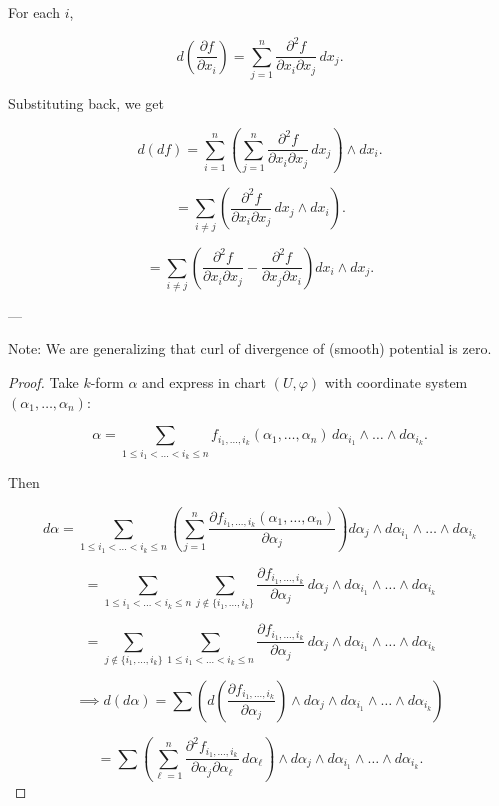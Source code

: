 \documentclass[11pt]{article}
\theoremstyle{definition}
\theoremstyle{remark}
\begin{document}
For each $i$,

\[
d\left(\frac{\partial f}{\partial x_i}\right) = \sum_{j=1}^n \frac{\partial^2 f}{\partial x_i \partial x_j} \, dx_j.
\]

Substituting back, we get

\[
d(df) = \sum_{i=1}^n \left(\sum_{j=1}^n \frac{\partial^2 f}{\partial x_i \partial x_j} \, dx_j\right) \wedge dx_i.
\]

\[
= \sum_{i \neq j} \left(\frac{\partial^2 f}{\partial x_i \partial x_j} \, dx_j \wedge dx_i\right).
\]

\[
= \sum_{i \neq j} \left(\frac{\partial^2 f}{\partial x_i \partial x_j} - \frac{\partial^2 f}{\partial x_j \partial x_i}\right) dx_i \wedge dx_j.
\]

---

Note: We are generalizing that curl of divergence of (smooth) potential is zero.

\begin{proof}
Take $k$-form $\alpha$ and express in chart $(U, \varphi)$ with coordinate system $(\alpha_1, \dots, \alpha_n)$:

\[
\alpha = \sum_{1 \leq i_1 < \dots < i_k \leq n} f_{i_1, \dots, i_k}(\alpha_1, \dots, \alpha_n) \, d\alpha_{i_1} \wedge \dots \wedge d\alpha_{i_k}.
\]

Then

\[
d\alpha = \sum_{1 \leq i_1 < \dots < i_k \leq n} \left( \sum_{j=1}^n \frac{\partial f_{i_1, \dots, i_k}(\alpha_1, \dots, \alpha_n)}{\partial \alpha_j} \right) d\alpha_j \wedge d\alpha_{i_1} \wedge \dots \wedge d\alpha_{i_k}
\]

\[
= \sum_{1 \leq i_1 < \dots < i_k \leq n} \sum_{j \notin \{i_1, \dots, i_k\}} \frac{\partial f_{i_1, \dots, i_k}}{\partial \alpha_j} \, d\alpha_j \wedge d\alpha_{i_1} \wedge \dots \wedge d\alpha_{i_k}
\]

\[
= \sum_{j \notin \{i_1, \dots, i_k\}} \sum_{1 \leq i_1 < \dots < i_k \leq n} \frac{\partial f_{i_1, \dots, i_k}}{\partial \alpha_j} \, d\alpha_j \wedge d\alpha_{i_1} \wedge \dots \wedge d\alpha_{i_k}
\]

\[
\implies d(d\alpha) = \sum \left( d \left( \frac{\partial f_{i_1, \dots, i_k}}{\partial \alpha_j} \right) \wedge d\alpha_j \wedge d\alpha_{i_1} \wedge \dots \wedge d\alpha_{i_k} \right)
\]

\[
= \sum \left( \sum_{\ell=1}^n \frac{\partial^2 f_{i_1, \dots, i_k}}{\partial \alpha_j \partial \alpha_\ell} \, d\alpha_\ell \right) \wedge d\alpha_j \wedge d\alpha_{i_1} \wedge \dots \wedge d\alpha_{i_k}.
\]
\end{proof}
\end{document}

